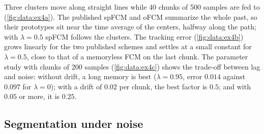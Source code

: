 Three clusters move along straight lines while 40 chunks of 500 samples are fed to  (\cref{fig:data:ex4a}). The published spFCM and oFCM summarize the whole past, so their prototypes sit near the time average of the centers, halfway along the path; with $\lambda=0.5$ spFCM follows the clusters. The tracking error (\cref{fig:data:ex4b}) grows linearly for the two published schemes and settles at a small constant for $\lambda=0.5$, close to that of a memoryless FCM on the last chunk. The parameter study with chunks of 200 samples (\cref{fig:data:ex4c}) shows the trade-off between lag and noise: without drift, a long memory is best ($\lambda=0.95$, error $0.014$ against $0.097$ for $\lambda=0$); with a drift of $0.02$ per chunk, the best factor is $0.5$; and with $0.05$ or more, it is $0.25$.


\subsection{Segmentation under noise}

